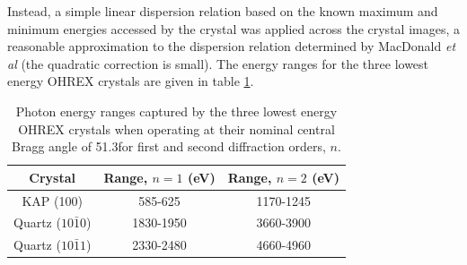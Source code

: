 Instead, a simple linear dispersion relation based on the known maximum and minimum energies accessed by the crystal was applied across the crystal images, a reasonable approximation to the dispersion relation determined by MacDonald \textit{et al} \cite{macdonaldAbsoluteThroughputCalibration2021} (the quadratic correction is small). The energy ranges for the three lowest energy OHREX crystals are given in table \ref{tab:dispersion}.
\begin{table}
	\centering
\begin{tabular}{ccc}
	\hline \hline
	Crystal               & Range, $n=1$ (eV) & Range, $n=2$ (eV) \\ \hline
	KAP (100)             & 585-625          & 1170-1245        \\
	Quartz ($10\bar{1}0$) & 1830-1950        & 3660-3900        \\
	Quartz ($10\bar{1}1$) & 2330-2480        & 4660-4960  \\     \hline \hline
\end{tabular}
	\caption{\label{tab:dispersion} Photon energy ranges captured by the three lowest energy OHREX crystals when operating at their nominal central Bragg angle of 51.3\degree for first and second diffraction orders, $n$.}
\end{table}

